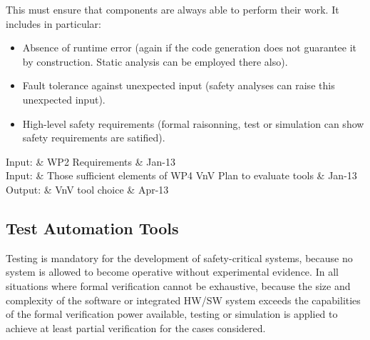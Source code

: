 \documentclass{template/openetcs_article}
\begin{document}

This must ensure that components are always able to perform their work.
It includes in particular:
\begin{itemize}
  \item Absence of runtime error (again if the code generation does
        not guarantee it by construction. Static analysis can be employed
        there also).
  \item Fault tolerance against unexpected input (safety analyses can raise this unexpected input).
  \item High-level safety requirements (formal raisonning, test or simulation can show safety requirements are satified).
\end{itemize}

\begin{inoutput}
Input: & WP2 Requirements & Jan-13 \\
Input: & Those sufficient elements of WP4 VnV Plan to evaluate tools & Jan-13 \\
\hline
Output: & VnV tool choice & Apr-13 \\
\end{inoutput}



\subsection{Test Automation Tools}

Testing 
is mandatory for the development of safety-critical systems, because no system is allowed
to become operative without experimental evidence.
In all situations where formal verification cannot be exhaustive, because 
 the size and complexity of the software or integrated HW/SW system exceeds the
capabilities of the formal verification power available, testing or simulation is applied 
to achieve at least partial verification for the cases considered.
\end{document}
